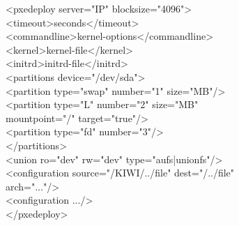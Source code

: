 \begin{itemize}
	\begin{Command}{14cm}
	<pxedeploy server="IP" blocksize="4096">\\
	\hspace*{1cm}<timeout>seconds</timeout>\\
	\hspace*{1cm}<commandline>kernel-options</commandline>\\
	\hspace*{1cm}<kernel>kernel-file</kernel>\\
	\hspace*{1cm}<initrd>initrd-file</initrd>\\
	\hspace*{1cm}<partitions device="/dev/sda">\\
	\hspace*{2cm}<partition type="swap" number="1" size="MB"/>\\
	\hspace*{2cm}<partition type="L" number="2" size="MB"\\
	\hspace*{4.5cm}mountpoint="/" target="true"/>\\
	\hspace*{2cm}<partition type="fd" number="3"/>\\
	\hspace*{1cm}</partitions>\\
	\hspace*{1cm}<union ro="dev" rw="dev" type="aufs|unionfs"/>\\
	\hspace*{1cm}<configuration source="/KIWI/../file" dest="/../file"\\
	\hspace*{4.5cm}arch="..."/>\\
	\hspace*{1cm}<configuration .../>\\
	</pxedeploy>
	\end{Command}


\end{itemize}
